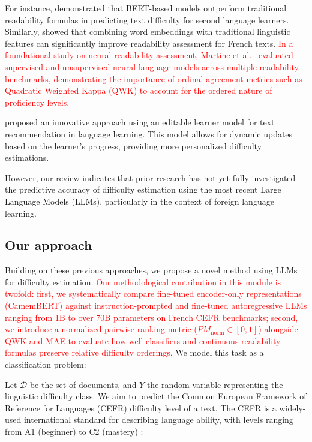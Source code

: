 For instance, \cite{imperial2021bert} demonstrated that BERT-based models outperform traditional readability formulas in predicting text difficulty for second language learners. Similarly, \cite{wilkens2022fabra} showed that combining word embeddings with traditional linguistic features can significantly improve readability assessment for French texts. \textcolor{red}{In a foundational study on neural readability assessment, Martinc et al.\ \cite{martinc2021supervised} evaluated supervised and unsupervised neural language models across multiple readability benchmarks, demonstrating the importance of ordinal agreement metrics such as Quadratic Weighted Kappa (QWK) to account for the ordered nature of proficiency levels.}

\cite{lee2022editable} proposed an innovative approach using an editable learner model for text recommendation in language learning. This model allows for dynamic updates based on the learner's progress, providing more personalized difficulty estimations.

However, our review indicates that prior research has not yet fully investigated the predictive accuracy of difficulty estimation using the most recent Large Language Models (LLMs), particularly in the context of foreign language learning.

\subsection{Our approach}

Building on these previous approaches, we propose a novel method using LLMs for difficulty estimation. \textcolor{red}{Our methodological contribution in this module is twofold: first, we systematically compare fine-tuned encoder-only representations (CamemBERT) against instruction-prompted and fine-tuned autoregressive LLMs ranging from 1B to over 70B parameters on French CEFR benchmarks; second, we introduce a normalized pairwise ranking metric ($PM_{\text{norm}} \in [0, 1]$) alongside QWK and MAE to evaluate how well classifiers and continuous readability formulas preserve relative difficulty orderings.} We model this task as a classification problem:

Let \(\mathcal{D}\) be the set of documents, and \(Y\) the random variable representing the linguistic difficulty class. We aim to predict the Common European Framework of Reference for Languages (CEFR) difficulty level of a text. The CEFR is a widely-used international standard for describing language ability, with levels ranging from A1 (beginner) to C2 (mastery) \cite{council2001common}:

